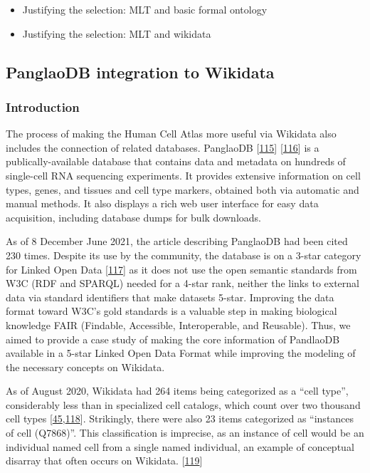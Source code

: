 \begin{itemize}
\item
  Justifying the selection: MLT and basic formal ontology
\item
  Justifying the selection: MLT and wikidata
\end{itemize}

\hypertarget{panglaodb-integration-to-wikidata}{%
\subsection{PanglaoDB integration to Wikidata}\label{panglaodb-integration-to-wikidata}}

\hypertarget{introduction}{%
\subsubsection{Introduction}\label{introduction}}

The process of making the Human Cell Atlas more useful via Wikidata also includes the connection of related databases.
PanglaoDB {[}\protect\hyperlink{ref-M0lqRYJb}{115}{]} {[}\protect\hyperlink{ref-T3PlZ3Vh}{116}{]} is a publically-available database that contains data and metadata on hundreds of single-cell RNA sequencing experiments.
It provides extensive information on cell types, genes, and tissues and cell type markers, obtained both via automatic and manual methods.
It also displays a rich web user interface for easy data acquisition, including database dumps for bulk downloads.

As of 8 December June 2021, the article describing PanglaoDB had been cited 230 times.
Despite its use by the community, the database is on a 3-star category for Linked Open Data {[}\protect\hyperlink{ref-OGXYtGZ8}{117}{]} as it does not use the open semantic standards from W3C (RDF and SPARQL) needed for a 4-star rank, neither the links to external data via standard identifiers that make datasets 5-star.
Improving the data format toward W3C's gold standards is a valuable step in making biological knowledge FAIR (Findable, Accessible, Interoperable, and Reusable).
Thus, we aimed to provide a case study of making the core information of PandlaoDB available in a 5-star Linked Open Data Format while improving the modeling of the necessary concepts on Wikidata.

As of August 2020, Wikidata had 264 items being categorized as a ``cell type'', considerably less than in specialized cell catalogs, which count over two thousand cell types {[}\protect\hyperlink{ref-agnqfdk6}{45},\protect\hyperlink{ref-4AEy2xhQ}{118}{]}.
Strikingly, there were also 23 items categorized as ``instances of cell (Q7868)''. This classification is imprecise, as an instance of cell would be an individual named cell from a single named individual, an example of conceptual disarray that often occurs on Wikidata. {[}\protect\hyperlink{ref-imSZTi52}{119}{]}

